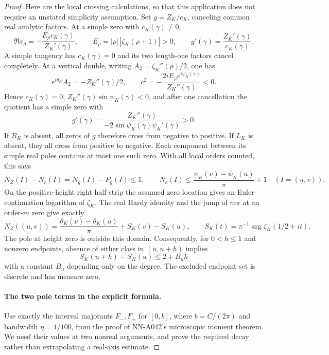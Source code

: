 \begin{proof}
Here are the local crossing calculations, so that this
application does not require an unstated simplicity assumption.
Set $g=Z_K/c_K$, canceling common real analytic factors.
At a simple zero with $c_K(\gamma)\ne0$,
\[
 \Re v_\rho=-\frac{E_\rho c_K(\gamma)}{Z_K'(\gamma)},
 \qquad E_\rho=|\rho|\,|\zeta_K(\rho+1)|>0,
 \qquad g'(\gamma)=\frac{Z_K'(\gamma)}{c_K(\gamma)}.
\]
A simple tangency has $c_K(\gamma)=0$ and its two
length-one factors cancel completely. At a vertical double,
writing $A_2=\zeta_K''(\rho)/2$, one has
\[
 e^{i\theta_K}A_2=-Z_K''(\gamma)/2,
 \qquad c^2=-\frac{2iE_\rho e^{i\psi_K(\gamma)}}{Z_K''(\gamma)}<0.
\]
Hence $c_K(\gamma)=0$, $Z_K''(\gamma)\sin\psi_K(\gamma)<0$,
and after one cancellation the quotient has a simple zero with
\[
 g'(\gamma)=\frac{Z_K''(\gamma)}{-2\sin\psi_K(\gamma)
                                       \psi_K'(\gamma)}>0.
\]
If $R_K$ is absent, all zeros of $g$ therefore cross from
negative to positive. If $L_K$ is absent, they all cross from
positive to negative. Each component between its simple real
poles contains at most one such zero. With all local orders
counted, this says
\[
 N_Z(I)-N_c(I)=N_g(I)-P_g(I)\le1,
 \qquad N_c(I)\le\frac{\psi_K(v)-\psi_K(u)}\pi+1
 \quad (I=(u,v)).
\]
On the positive-height right half-strip the assumed zero
location gives an Euler-continuation logarithm of $\zeta_K$.
The real Hardy identity and the jump of $m\pi$ at an
order-$m$ zero give exactly
\[
 N_Z((u,v))=\frac{\theta_K(v)-\theta_K(u)}\pi
                                      +S_K(v)-S_K(u),
 \qquad S_K(t)=\pi^{-1}\arg\zeta_K(1/2+it).
\]
The pole at height zero is outside this domain. Consequently,
for $0<h\le1$ and nonzero endpoints, absence of either
class in $(u,u+h)$ implies
\begin{equation}\label{eq:A043-crossing}
                 S_K(u+h)-S_K(u)\le2+B_nh
\end{equation}
with a constant $B_n$ depending only on the degree. The
excluded endpoint set is discrete and has measure zero.

\paragraph{The two pole terms in the explicit formula.}
Use exactly the interval majorants $F_-,F_+$ for
$[0,b]$, where $b=C/(2\pi)$ and bandwidth $\eta=1/100$,
from the proof of NN-A042's microscopic moment theorem.
We need their values at two nonreal arguments, and prove the
required decay rather than extrapolating a real-axis estimate.


\end{proof}
